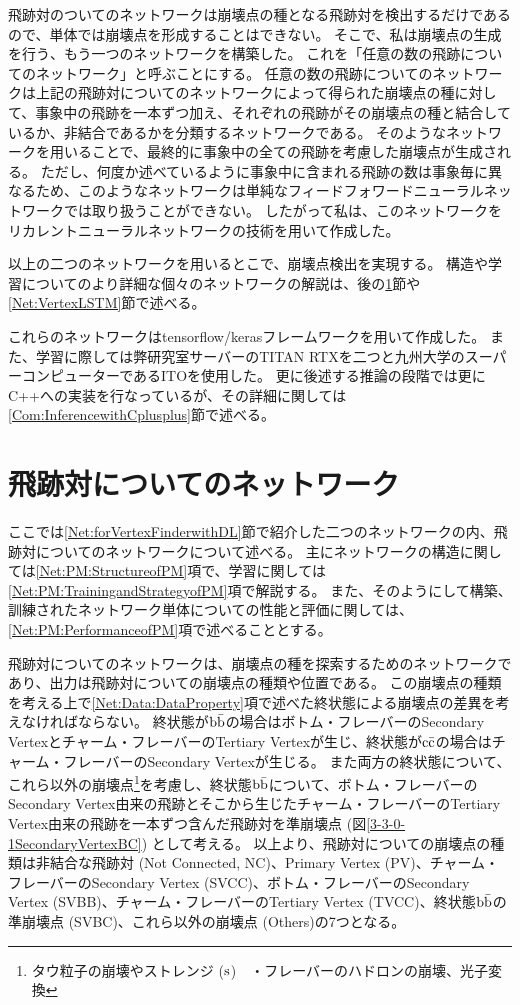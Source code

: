 飛跡対のついてのネットワークは崩壊点の種となる飛跡対を検出するだけであるので、単体では崩壊点を形成することはできない。
そこで、私は崩壊点の生成を行う、もう一つのネットワークを構築した。
これを「任意の数の飛跡についてのネットワーク」と呼ぶことにする。
任意の数の飛跡についてのネットワークは上記の飛跡対についてのネットワークによって得られた崩壊点の種に対して、事象中の飛跡を一本ずつ加え、それぞれの飛跡がその崩壊点の種と結合しているか、非結合であるかを分類するネットワークである。
そのようなネットワークを用いることで、最終的に事象中の全ての飛跡を考慮した崩壊点が生成される。
ただし、何度か述べているように事象中に含まれる飛跡の数は事象毎に異なるため、このようなネットワークは単純なフィードフォワードニューラルネットワークでは取り扱うことができない。
したがって私は、このネットワークをリカレントニューラルネットワークの技術を用いて作成した。

以上の二つのネットワークを用いるとこで、崩壊点検出を実現する。
構造や学習についてのより詳細な個々のネットワークの解説は、後の\ref{Net:PairModel}節や\ref{Net:VertexLSTM}節で述べる。

これらのネットワークはtensorflow/kerasフレームワークを用いて作成した。
また、学習に際しては弊研究室サーバーのTITAN RTXを二つと九州大学のスーパーコンピューターであるITOを使用した。
更に後述する推論の段階では更にC++への実装を行なっているが、その詳細に関しては\ref{Com:InferencewithCplusplus}節で述べる。

\section{飛跡対についてのネットワーク} \label{Net:PairModel}

ここでは\ref{Net:forVertexFinderwithDL}節で紹介した二つのネットワークの内、飛跡対についてのネットワークについて述べる。
主にネットワークの構造に関しては\ref{Net:PM:StructureofPM}項で、学習に関しては\ref{Net:PM:TrainingandStrategyofPM}項で解説する。
また、そのようにして構築、訓練されたネットワーク単体についての性能と評価に関しては、\ref{Net:PM:PerformanceofPM}項で述べることとする。

飛跡対についてのネットワークは、崩壊点の種を探索するためのネットワークであり、出力は飛跡対についての崩壊点の種類や位置である。
この崩壊点の種類を考える上で\ref{Net:Data:DataProperty}項で述べた終状態による崩壊点の差異を考えなければならない。
終状態が$\rm b\bar{b}$の場合はボトム・フレーバーのSecondary Vertexとチャーム・フレーバーのTertiary Vertexが生じ、終状態が$\rm c\bar{c}$の場合はチャーム・フレーバーのSecondary Vertexが生じる。
また両方の終状態について、これら以外の崩壊点\footnote{タウ粒子の崩壊やストレンジ ($\rm s$)　・フレーバーのハドロンの崩壊、光子変換}を考慮し、終状態$\rm b\bar{b}$について、ボトム・フレーバーのSecondary Vertex由来の飛跡とそこから生じたチャーム・フレーバーのTertiary Vertex由来の飛跡を一本ずつ含んだ飛跡対を準崩壊点 (図\ref{3-3-0-1SecondaryVertexBC}) として考える。
以上より、飛跡対についての崩壊点の種類は非結合な飛跡対 (Not Connected, NC)、Primary Vertex (PV)、チャーム・フレーバーのSecondary Vertex (SVCC)、ボトム・フレーバーのSecondary Vertex (SVBB)、チャーム・フレーバーのTertiary Vertex (TVCC)、終状態$\rm b\bar{b}$の準崩壊点 (SVBC)、これら以外の崩壊点 (Others)の7つとなる。

